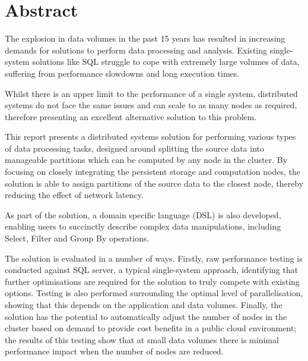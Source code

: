\chapter*{Abstract}

The explosion in data volumes in the past 15 years has resulted in increasing demands for solutions to perform data processing and analysis. Existing single-system solutions like SQL struggle to cope with extremely large volumes of data, suffering from performance slowdowns and long execution times. 

Whilst there is an upper limit to the performance of a single system, distributed systems do not face the same issues and can scale to as many nodes as required, therefore presenting an excellent alternative solution to this problem.

This report presents a distributed systems solution for performing various types of data processing tasks, designed around splitting the source data into manageable partitions which can be computed by any node in the cluster. By focusing on closely integrating the persistent storage and computation nodes, the solution is able to assign partitions of the source data to the closest node, thereby reducing the effect of network latency. 

As part of the solution, a domain specific language (DSL) is also developed, enabling users to succinctly describe complex data manipulations, including Select, Filter and Group By operations.

The solution is evaluated in a number of ways. Firstly, raw performance testing is conducted against SQL server, a typical single-system approach, identifying that further optimisations are required for the solution to truly compete with existing options. Testing is also performed surrounding the optimal level of parallelisation, showing that this depends on the application and data volumes. Finally, the solution has the potential to automatically adjust the number of nodes in the cluster based on demand to provide cost benefits in a public cloud environment; the results of this testing show that at small data volumes there is minimal performance impact when the number of nodes are reduced.

